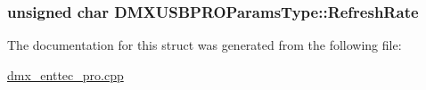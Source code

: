 \hypertarget{struct_d_m_x_u_s_b_p_r_o_params_type_a6258e9923d9bc0725d4b2cc0be515d70}{
\subsubsection[{Refresh\-Rate}]{\setlength{\rightskip}{0pt plus 5cm}unsigned char D\-M\-X\-U\-S\-B\-P\-R\-O\-Params\-Type\-::\-Refresh\-Rate}}\label{struct_d_m_x_u_s_b_p_r_o_params_type_a6258e9923d9bc0725d4b2cc0be515d70}


The documentation for this struct was generated from the following file\-:\begin{DoxyCompactItemize}
\item 
\hyperlink{dmx__enttec__pro_8cpp}{dmx\-\_\-enttec\-\_\-pro.\-cpp}\end{DoxyCompactItemize}
